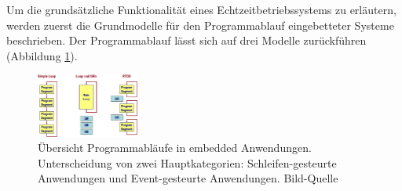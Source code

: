 Um die grund\-sätz\-liche Funktionalität eines Echtzeitbetriebssystems zu erläutern, werden zuerst die Grundmodelle für den Programmablauf eingebetteter Systeme beschrieben. Der Programmablauf lässt sich auf drei Modelle zu\-rück\-füh\-ren (Abbildung \ref{fig:Programmablauf}). 
\begin{figure}[ht]
	\centering
		\includegraphics[width=0.3\textwidth]{Pictures/EmbeddedCom/cwrtos2f5c.jpg}
	\caption{Übersicht Programmabläufe in embedded Anwendungen. Unterscheidung von zwei Hauptkategorien: Schleifen-gesteurte Anwendungen und Event-gesteurte Anwendungen. Bild-Quelle~\protect{}}
	\label{fig:Programmablauf}
\end{figure}
